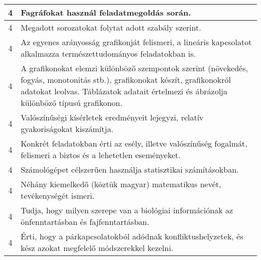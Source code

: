 \begin{longtable}{c | p{12cm} }
                                          4 &  Fagráfokat használ feladatmegoldás során. \\ \hline
                                          4 &  Megadott sorozatokat folytat adott szabály szerint. \\ \hline
                                          4 &  Az egyenes arányosság grafikonját felismeri, a lineáris kapcsolatot alkalmazza természettudományos feladatokban is. \\ \hline
                                          4 &  A grafikonokat elemzi különböző szempontok szerint (növekedés, fogyás, monotonitás stb.), grafikonokat készít, grafikonokról adatokat leolvas. Táblázatok adatait értelmezi és ábrázolja különböző típusú grafikonon. \\ \hline
                                          4 &  Valószínűségi kísérletek eredményeit lejegyzi, relatív gyakoriságokat kiszámítja. \\ \hline
                                          4 &  Konkrét feladatokban érti az esély, illetve valószínűség fogalmát, felismeri a biztos és a lehetetlen eseményeket. \\ \hline
                                          4 &  Számológépet célszerűen használja statisztikai számításokban. \\ \hline
                                          4 &  Néhány kiemelkedő (köztük magyar) matematikus nevét, tevékenységét ismeri. \\ \hline
                                          4 &  Tudja, hogy milyen szerepe van a biológiai információnak az önfenntartásban és fajfenntartásban. \\ \hline
                                          4 &  Érti, hogy a párkapcsolatokból adódnak konfliktushelyzetek, és kész azokat megfelelő módszerekkel kezelni. \\ \hline
                                      
                        \end{longtable}
            \clearpage

